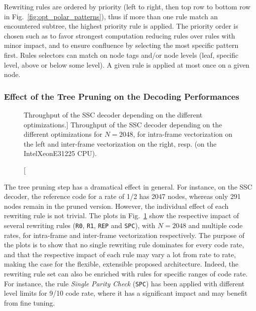 Rewriting rules are ordered by priority (left to right, then top row to bottom
row in Fig.~\ref{fig:opt_polar_patterns}), thus if more than one rule match an
encountered subtree, the highest priority rule is applied. The priority order is
chosen such as to favor strongest computation reducing rules over rules with
minor impact, and to ensure confluence by selecting the most specific pattern
first. Rules selectors can match on node tags and/or node levels (leaf, specific
level, above or below some level). A given rule is applied at most once on a
given node.

\subsubsection{Effect of the Tree Pruning on the Decoding Performances}

\begin{figure}[htp]
  \centering
  \quad
  \caption
    [Throughput of the SSC decoder depending on the different optimizations.]
    {Throughput of the SSC decoder depending on the different optimizations for
    $N = 2048$, for intra-frame vectorization on the left and inter-frame
    vectorization on the right, resp. (on the Intel\R Xeon\TM E31225 CPU).}
  \label{plot:opt_polar_sc_tree_cut}
\end{figure}

The tree pruning step has a dramatical effect in general. For instance, on the
SSC decoder, the reference code for a rate of 1/2 has 2047 nodes, whereas only
291 nodes remain in the pruned version. However, the individual effect of each
rewriting rule is not trivial. The plots in
Fig.~\ref{plot:opt_polar_sc_tree_cut} show the respective impact of several
rewriting rules (\verb|R0|, \verb|R1|, \verb|REP| and \verb|SPC|), with
$N = 2048$ and multiple code rates, for intra-frame and inter-frame
vectorization respectively. The purpose of the plots is to show that no single
rewriting rule dominates for every code rate, and that the respective impact of
each rule may vary a lot from rate to rate, making the case for the flexible,
extensible proposed architecture. Indeed, the rewriting rule set can also be
enriched with rules for specific ranges of code rate. For instance, the rule
\emph{Single Parity Check} (\verb|SPC|) has been applied with different level
limits for 9/10 code rate, where it has a significant impact and may benefit
from fine tuning.

